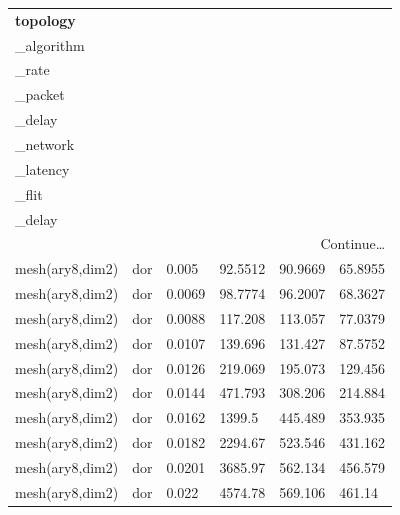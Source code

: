 \begin{longtable}[H]{llllll}
\textbf{topology} &
  \textbf{\begin{tabular}[c]{@{}l@{}}routing\\ \_algorithm\end{tabular}} &
  \textbf{\begin{tabular}[c]{@{}l@{}}injection\\ \_rate\end{tabular}} &
  \textbf{\begin{tabular}[c]{@{}l@{}}average\\ \_packet\\ \_delay\end{tabular}} &
  \textbf{\begin{tabular}[c]{@{}l@{}}average\\ \_network\\ \_latency\end{tabular}} &
  \textbf{\begin{tabular}[c]{@{}l@{}}average\\ \_flit\\ \_delay\end{tabular}} \\ \hline
\endhead %
\hline
\multicolumn{6}{r}{Continue…}\\
\endfoot %
\hline
\endlastfoot%
mesh(ary8,dim2) & dor & 0.005  & 92.5512 & 90.9669 & 65.8955 \\
mesh(ary8,dim2) & dor                         & 0.0069 & 98.7774 & 96.2007 & 68.3627 \\
mesh(ary8,dim2) & dor                         & 0.0088 & 117.208 & 113.057 & 77.0379 \\
mesh(ary8,dim2) & dor                         & 0.0107 & 139.696 & 131.427 & 87.5752 \\
mesh(ary8,dim2) & dor                         & 0.0126 & 219.069 & 195.073 & 129.456 \\
mesh(ary8,dim2) & dor                         & 0.0144 & 471.793 & 308.206 & 214.884 \\
mesh(ary8,dim2) & dor                         & 0.0162 & 1399.5  & 445.489 & 353.935 \\
mesh(ary8,dim2) & dor                         & 0.0182 & 2294.67 & 523.546 & 431.162 \\
mesh(ary8,dim2) & dor                         & 0.0201 & 3685.97 & 562.134 & 456.579 \\
mesh(ary8,dim2) & dor                         & 0.022  & 4574.78 & 569.106 & 461.14  \\ \hline

\end{longtable}
